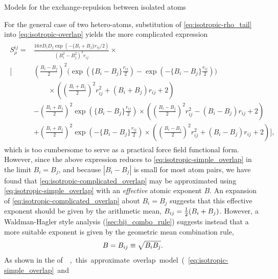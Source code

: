 \begin{subsection}{Models for the exchange-repulsion between isolated atoms}


For the general case of two hetero-atoms, substitution of
\cref{eq:isotropic-rho_tail} into \cref{eq:isotropic-overlap} yields the more complicated expression
\cite{Tai1986,Rosen1931}
\begin{align}
\label{eq:isotropic-complicated_overlap}
\begin{split}
S^{ij}_{\rho} = &
\frac{16\pi D_i D_j \exp(-\{B_i + B_j\}r_{ij}/2)}{(B_i^2-B_j^2)^3r_{ij}}
\times \\
\Bigg [ &
\left(\frac{B_i - B_j}{2}\right)^2 
\bigg(\exp \left(\{B_i-B_j\}\frac{r_{ij}}{2}\right) - \exp \left(-\{B_i-B_j\}\frac{r_{ij}}{2}\right) \bigg) \\
& \qquad \times \left( \left(\frac{B_i + B_j}{2}\right)^2r_{ij}^2 + (B_i + B_j)r_{ij} + 2 \right) \\
& - \left(\frac{B_i + B_j}{2}\right)^2 \exp \left(\{B_i-B_j\}\frac{r_{ij}}{2}\right)
\times \left( \left(\frac{B_i - B_j}{2}\right)^2r_{ij}^2 - (B_i - B_j)r_{ij} + 2 \right) \\
& + \left(\frac{B_i + B_j}{2}\right)^2 \exp \left(-\{B_i-B_j\}\frac{r_{ij}}{2}\right)
\times \left( \left(\frac{B_i - B_j}{2}\right)^2r_{ij}^2 + (B_i - B_j)r_{ij} + 2 \right)
\Bigg ],
\end{split}
\end{align}
%
which is too
cumbersome to serve as a practical force field functional form.
However, since the above expression reduces to
\cref{eq:isotropic-simple_overlap} in the limit $B_i = B_j$, 
and because $|B_i - B_j|$ is small for most atom pairs,
we have found that \cref{eq:isotropic-complicated_overlap} may be approximated
using \cref{eq:isotropic-simple_overlap} with an \emph{effective} atomic exponent $B$. 
An expansion of \cref{eq:isotropic-complicated_overlap} about $B_i = B_j$
suggests that this effective exponent should be given by the arithmetic mean,
$B_{ij} = \frac12 (B_i + B_j)$. However, a Waldman-Hagler style analysis \cite{Waldman1993}
(\cref{sec:bij_combo_rule}) suggests instead that a more suitable
exponent is given by the geometric mean combination rule,
%
\begin{align}
\label{eq:isotropic-isaff_bij}
B = B_{ij} \equiv \sqrt{B_iB_j}.
\end{align}
% 
As shown in the \si of , this approximate overlap model (\cref{eq:isotropic-simple_overlap} and

\end{subsection}
